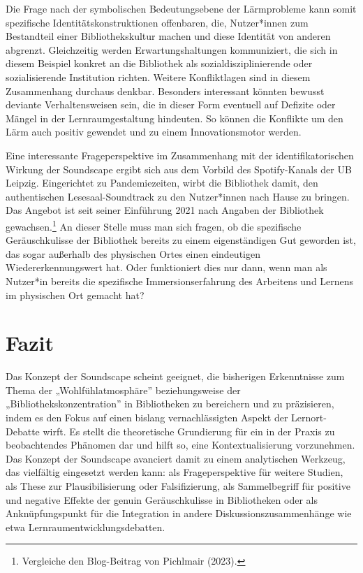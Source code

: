 \documentclass[a4paper,
fontsize=11pt,
oneside,
numbers=noperiodatend,
parskip=half-,
bibliography=totoc,
final
]{scrartcl}
\begin{document}
Die Frage nach der symbolischen Bedeutungsebene der Lärmprobleme kann
somit spezifische Identitätskonstruktionen offenbaren, die, Nutzer*innen
zum Bestandteil einer Bibliothekskultur machen und diese Identität von
anderen abgrenzt. Gleichzeitig werden Erwartungshaltungen kommuniziert,
die sich in diesem Beispiel konkret an die Bibliothek als
sozialdisziplinierende oder sozialisierende Institution richten. Weitere
Konfliktlagen sind in diesem Zusammenhang durchaus denkbar. Besonders
interessant könnten bewusst deviante Verhaltensweisen sein, die in
dieser Form eventuell auf Defizite oder Mängel in der Lernraumgestaltung
hindeuten. So können die Konflikte um den Lärm auch positiv gewendet und
zu einem Innovationsmotor werden.

Eine interessante Frageperspektive im Zusammenhang mit der
identifikatorischen Wirkung der Soundscape ergibt sich aus dem Vorbild
des Spotify-Kanals der UB Leipzig. Eingerichtet zu Pandemiezeiten, wirbt
die Bibliothek damit, den authentischen Lesesaal-Soundtrack zu den
Nutzer*innen nach Hause zu bringen. Das Angebot ist seit seiner
Einführung 2021 nach Angaben der Bibliothek gewachsen.\footnote{Vergleiche
  den Blog-Beitrag von Pichlmair (2023).} An dieser Stelle muss man sich
fragen, ob die spezifische Geräuschkulisse der Bibliothek bereits zu
einem eigenständigen Gut geworden ist, das sogar außerhalb des
physischen Ortes einen eindeutigen Wiedererkennungswert hat. Oder
funktioniert dies nur dann, wenn man als Nutzer*in bereits die
spezifische Immersionserfahrung des Arbeitens und Lernens im physischen
Ort gemacht hat?

\hypertarget{fazit}{%
\section{Fazit}\label{fazit}}

Das Konzept der Soundscape scheint geeignet, die bisherigen Erkenntnisse
zum Thema der „Wohlfühlatmosphäre'' beziehungsweise der
„Bibliothekskonzentration'' in Bibliotheken zu bereichern und zu
präzisieren, indem es den Fokus auf einen bislang vernachlässigten
Aspekt der Lernort-Debatte wirft. Es stellt die theoretische Grundierung
für ein in der Praxis zu beobachtendes Phänomen dar und hilft so, eine
Kontextualisierung vorzunehmen. Das Konzept der Soundscape avanciert
damit zu einem analytischen Werkzeug, das vielfältig eingesetzt werden
kann: als Frageperspektive für weitere Studien, als These zur
Plausibilisierung oder Falsifizierung, als Sammelbegriff für positive
und negative Effekte der genuin Geräuschkulisse in Bibliotheken oder als
Anknüpfungspunkt für die Integration in andere Diskussionszusammenhänge
wie etwa Lernraumentwicklungsdebatten.
\end{document}
